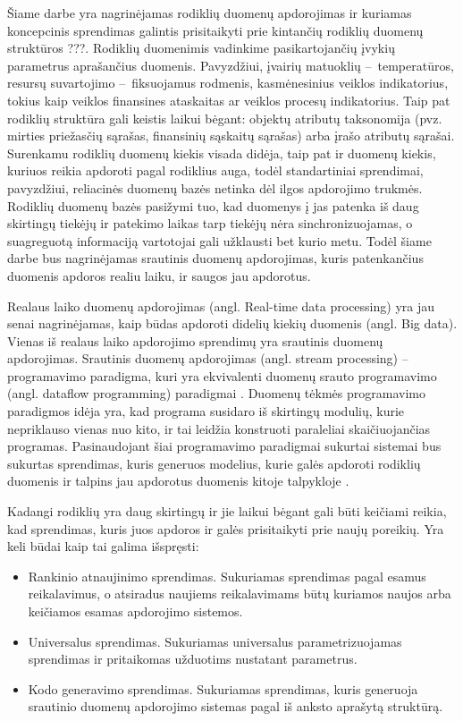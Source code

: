 \documentclass{VUMIFPSbakalaurinis}
\begin{document}
\tableofcontents

 
Šiame darbe yra nagrinėjamas rodiklių duomenų apdorojimas ir kuriamas koncepcinis sprendimas galintis prisitaikyti prie kintančių rodiklių duomenų struktūros ???. Rodiklių duomenimis vadinkime pasikartojančių įvykių parametrus aprašančius duomenis. Pavyzdžiui, įvairių matuoklių – temperatūros, resursų suvartojimo – fiksuojamus rodmenis, kasmėnesinius veiklos indikatorius, tokius kaip veiklos finansines ataskaitas ar veiklos procesų indikatorius. Taip pat rodiklių struktūra gali keistis laikui bėgant: objektų atributų taksonomija (pvz. mirties priežasčių sąrašas, finansinių sąskaitų sąrašas) arba įrašo atributų sąrašai. Surenkamu rodiklių duomenų kiekis visada didėja, taip pat ir duomenų kiekis, kuriuos reikia apdoroti pagal rodiklius auga, todėl standartiniai sprendimai, pavyzdžiui, reliacinės duomenų bazės netinka dėl ilgos apdorojimo trukmės. Rodiklių duomenų bazės pasižymi tuo, kad duomenys į jas patenka iš daug skirtingų tiekėjų ir patekimo laikas tarp tiekėjų nėra sinchronizuojamas, o suagreguotą informaciją vartotojai gali užklausti bet kurio metu. Todėl šiame darbe bus nagrinėjamas srautinis duomenų apdorojimas, kuris patenkančius duomenis apdoros realiu laiku, ir saugos jau apdorotus.  \par
Realaus laiko duomenų apdorojimas (angl. Real-time data processing) yra jau senai nagrinėjamas, kaip būdas apdoroti didelių kiekių duomenis (angl. Big data). Vienas iš realaus laiko apdorojimo sprendimų yra srautinis duomenų apdorojimas. Srautinis duomenų apdorojimas (angl. stream processing) – programavimo paradigma, kuri yra ekvivalenti duomenų srauto programavimo (angl. dataflow programming) paradigmai \cite{shortstreamproc}. Duomenų tėkmės programavimo paradigmos idėja yra, kad programa susidaro iš skirtingų modulių, kurie nepriklauso vienas nuo kito, ir tai leidžia konstruoti paraleliai skaičiuojančias programas. Pasinaudojant šiai programavimo paradigmai sukurtai sistemai bus sukurtas sprendimas, kuris generuos modelius, kurie galės apdoroti rodiklių duomenis ir talpins jau apdorotus duomenis kitoje talpykloje \cite{8Requirements}. 
\par
Kadangi rodiklių yra daug skirtingų ir jie laikui bėgant gali būti keičiami reikia, kad sprendimas, kuris juos apdoros ir galės prisitaikyti prie naujų poreikių. Yra keli būdai kaip tai galima išspręsti:
\begin{itemize}
    \item Rankinio atnaujinimo sprendimas. Sukuriamas sprendimas pagal esamus reikalavimus, o atsiradus naujiems reikalavimams būtų kuriamos naujos arba keičiamos esamas apdorojimo sistemos. 
    \item Universalus sprendimas. Sukuriamas universalus parametrizuojamas sprendimas ir pritaikomas užduotims nustatant parametrus.
    \item Kodo generavimo sprendimas. Sukuriamas sprendimas, kuris generuoja srautinio duomenų apdorojimo sistemas pagal iš anksto aprašytą struktūrą.  
\end{itemize}   
\end{document}
